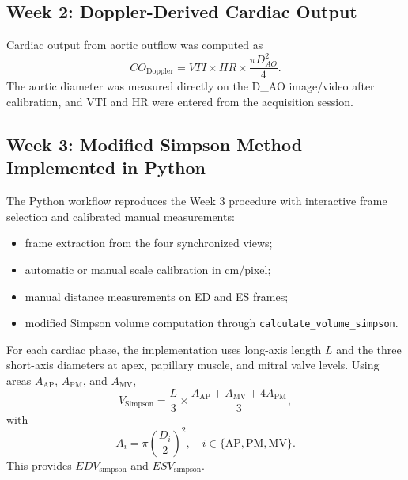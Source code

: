 \subsection{Week 2: Doppler-Derived Cardiac Output}
Cardiac output from aortic outflow was computed as
\begin{equation}
CO_{\mathrm{Doppler}} = VTI \times HR \times \frac{\pi D_{AO}^2}{4}.
\end{equation}
The aortic diameter was measured directly on the D\_AO image/video after calibration, and VTI and HR were entered from the acquisition session.

\subsection{Week 3: Modified Simpson Method Implemented in Python}
The Python workflow reproduces the Week 3 procedure with interactive frame selection and calibrated manual measurements:
\begin{itemize}
    \item frame extraction from the four synchronized views;
    \item automatic or manual scale calibration in cm/pixel;
    \item manual distance measurements on ED and ES frames;
    \item modified Simpson volume computation through \texttt{calculate\_volume\_simpson}.
\end{itemize}
For each cardiac phase, the implementation uses long-axis length $L$ and the three short-axis diameters at apex, papillary muscle, and mitral valve levels. Using areas $A_{\mathrm{AP}}$, $A_{\mathrm{PM}}$, and $A_{\mathrm{MV}}$,
\begin{equation}
V_{\mathrm{Simpson}} = \frac{L}{3}\times\frac{A_{\mathrm{AP}} + A_{\mathrm{MV}} + 4A_{\mathrm{PM}}}{3},
\end{equation}
with
\begin{equation}
A_i = \pi\left(\frac{D_i}{2}\right)^2, \quad i\in\{\mathrm{AP},\mathrm{PM},\mathrm{MV}\}.
\end{equation}
This provides $EDV_{\mathrm{simpson}}$ and $ESV_{\mathrm{simpson}}$.


